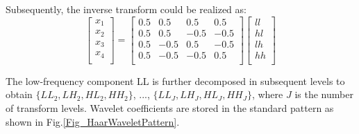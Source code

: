 \documentclass[11pt]{article}
\begin{document}
Subsequently, the inverse transform could be realized as:
$$
\left[{\begin{array}{c}
    x_1\\
	x_2\\
	x_3\\
	x_4\\
\end{array}}\right] =  
\left[{\begin{array}{cccc}
	0.5 & 0.5 & 0.5 & 0.5\\
	0.5 & 0.5 & -0.5 & -0.5\\
	0.5 & -0.5 & 0.5 & -0.5\\	
	0.5 & -0.5 & -0.5 & 0.5\\
\end{array}}\right]
\left[{\begin{array}{c}
	ll\\
	hl\\
	lh\\
	hh\\
\end{array}}\right]
$$

The low-frequency component LL is further decomposed in subsequent levels to obtain $\{LL_2, LH_2, HL_2, HH_2\}$, ..., $\{LL_J, LH_J, HL_J, HH_J\}$, where $J$ is the number of transform levels. Wavelet coefficients are stored in the standard pattern as shown in Fig.\ref{Fig_HaarWaveletPattern}. 
\end{document}
